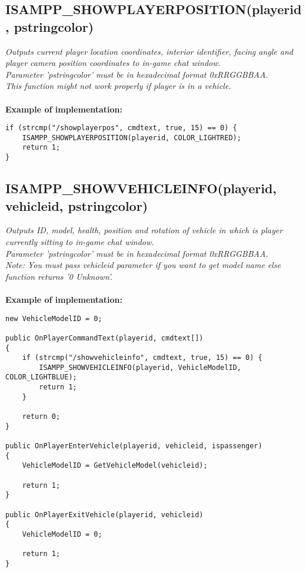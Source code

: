 \documentclass{article}
\begin{document}
\subsection{ISAMPP\_SHOWPLAYERPOSITION(playerid, pstringcolor)}

\textit{Outputs current player location coordinates, interior identifier, facing angle and player camera position coordinates to in-game chat window.
\\Parameter 'pstringcolor' must be in hexadecimal format 0xRRGGBBAA.
\\This function might not work properly if player is in a vehicle.}
\\
\\
\textbf{Example of implementation:}
\begin{verbatim}
if (strcmp("/showplayerpos", cmdtext, true, 15) == 0) {
    ISAMPP_SHOWPLAYERPOSITION(playerid, COLOR_LIGHTRED);
    return 1;
}
\end{verbatim}


\newpage
\subsection{ISAMPP\_SHOWVEHICLEINFO(playerid, vehicleid, pstringcolor)}

\textit{Outputs ID, model, health, position and rotation of vehicle in which is player currently sitting to in-game chat window.
\\Parameter 'pstringcolor' must be in hexadecimal format 0xRRGGBBAA.
\\Note: You must pass vehicleid parameter if you want to get model name else function returns '0 Unknown'.}
\\
\\
\textbf{Example of implementation:}
\begin{verbatim}
new VehicleModelID = 0;

public OnPlayerCommandText(playerid, cmdtext[])
{
    if (strcmp("/showvehicleinfo", cmdtext, true, 15) == 0) {
        ISAMPP_SHOWVEHICLEINFO(playerid, VehicleModelID, COLOR_LIGHTBLUE);
        return 1;
    }

    return 0;
}

public OnPlayerEnterVehicle(playerid, vehicleid, ispassenger)
{
    VehicleModelID = GetVehicleModel(vehicleid);

    return 1;
}

public OnPlayerExitVehicle(playerid, vehicleid)
{
    VehicleModelID = 0;

    return 1;
}
\end{verbatim}
\end{document}
